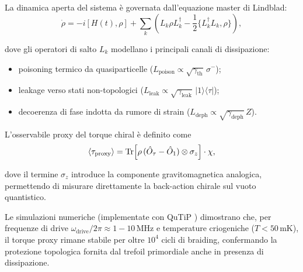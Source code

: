 \documentclass[11pt,a4paper]{article}
\let\oldcite\cite
\renewcommand{\cite}{\protect\oldcite}
\theoremstyle{plain}
\theoremstyle{definition}
\begin{document}
\vspace{0.7cm}

La dinamica aperta del sistema è governata dall'equazione master di Lindblad:
\begin{equation}
\dot{\rho} = -i [H(t), \rho] + \sum_k \left( L_k \rho L_k^\dagger - \frac{1}{2} \{ L_k^\dagger L_k, \rho \} \right),
\label{eq:lindblad_master}
\end{equation}

\vspace{0.3cm}


dove gli operatori di salto $L_k$ modellano i principali canali di dissipazione:

\vspace{0.2cm}
\begin{itemize}
    \item poisoning termico da quasiparticelle ($L_{\text{poison}} \propto \sqrt{\gamma_{\text{th}}} \, \sigma^-$);

    \vspace{0.2cm}
    \item leakage verso stati non-topologici ($L_{\text{leak}} \propto \sqrt{\gamma_{\text{leak}}} \, |1\rangle\langle\tau|$);

    \vspace{0.2cm}
    \item decoerenza di fase indotta da rumore di strain ($L_{\text{deph}} \propto \sqrt{\gamma_{\text{deph}}} \, Z$).
\end{itemize}

L'osservabile proxy del torque chiral è definito come
\begin{equation}
\langle \tau_{\text{proxy}} \rangle = \operatorname{Tr} \Bigl[ \rho \, (\hat{O}_\tau - \hat{O}_1) \otimes \sigma_z \Bigr] \cdot \chi,
\label{eq:torque_proxy}
\end{equation}


\vspace{0.3cm}


dove il termine $\sigma_z$ introduce la componente gravitomagnetica analogica, permettendo di misurare direttamente la back-action chirale sul vuoto quantistico.


\vspace{0.7cm}

Le simulazioni numeriche (implementate con QuTiP \cite{Johansson2012}) dimostrano che, per frequenze di drive $\omega_{\text{drive}}/2\pi \approx 1-10$\,MHz e temperature criogeniche ($T < 50$\,mK), il torque proxy rimane stabile per oltre $10^4$ cicli di braiding, confermando la protezione topologica fornita dal trefoil primordiale anche in presenza di dissipazione.
\end{document}
